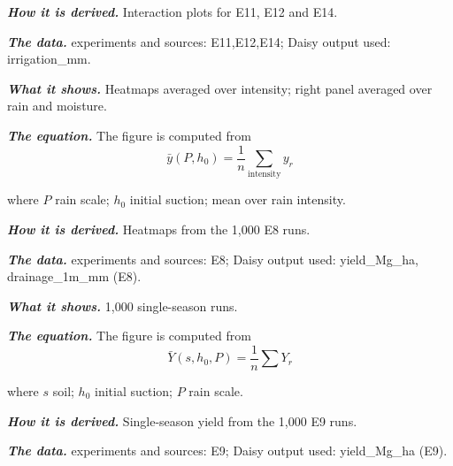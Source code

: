 \par\noindent\textbf{\color{khmag}\emph{How it is derived.}} Interaction plots for E11, E12 and E14.
\par\noindent\textbf{\color{khmag}\emph{The data.}} experiments and sources: E11,E12,E14; Daisy output used: irrigation\_mm.
\par\vspace{6pt}\noindent{}\par\nobreak
{}\label{fig:a20_24}
\par\noindent\textbf{\color{khmag}\emph{What it shows.}} Heatmaps averaged over intensity; right panel averaged over rain and moisture.
\par\noindent\textbf{\color{khmag}\emph{The equation.}} The figure is computed from
\begin{equation}\boxed{\bar y(P,h_0)=\dfrac1n\sum_{\text{intensity}} y_r}\end{equation}
\par\noindent where $P$ rain scale; $h_0$ initial suction; mean over rain intensity.
\par\noindent\textbf{\color{khmag}\emph{How it is derived.}} Heatmaps from the 1,000 E8 runs.
\par\noindent\textbf{\color{khmag}\emph{The data.}} experiments and sources: E8; Daisy output used: yield\_Mg\_ha, drainage\_1m\_mm (E8).
\par\vspace{6pt}\noindent{}\par\nobreak
{}\label{fig:a20_25}
\par\noindent\textbf{\color{khmag}\emph{What it shows.}} 1,000 single-season runs.
\par\noindent\textbf{\color{khmag}\emph{The equation.}} The figure is computed from
\begin{equation}\boxed{\bar Y(s,h_0,P)=\dfrac1n\sum Y_r}\end{equation}
\par\noindent where $s$ soil; $h_0$ initial suction; $P$ rain scale.
\par\noindent\textbf{\color{khmag}\emph{How it is derived.}} Single-season yield from the 1,000 E9 runs.
\par\noindent\textbf{\color{khmag}\emph{The data.}} experiments and sources: E9; Daisy output used: yield\_Mg\_ha (E9).
